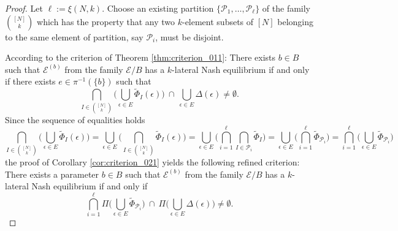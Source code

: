 \documentclass[a4paper,11pt,reqno,english]{amsart}
\theoremstyle{plain}
\theoremstyle{definition}
\newcommand{\Ecal}{\mathcal{E}}
\begin{document}
\begin{proof}
	Let $\ell:=\xi(N,k)$.
	Choose an existing partition $\{\mathcal{P}_1,\dots,\mathcal{P}_{\ell}\}$ of the family $\binom{[N]}{k}$ which has the property that any two $k$-element subsets of $[N]$ belonging to the same element of partition, say $\mathcal{P}_i$, must be disjoint.

	\smallskip
	According to the criterion of Theorem \ref{thm:criterion_011}: There exists  $b\in B$ such that  $\Ecal^{(b)}$ from the family $\Ecal/B$ has a $k$-lateral Nash equilibrium if and only if there exists  $e\in \pi^{-1}(\{b\})$ such that
	\[
		\bigcap_{I\in\binom{[N]}{k}}\big(\bigcup_{\epsilon\in E}\widetilde{\Phi}_I (\epsilon)\big) \ \cap \ \bigcup_{\epsilon\in E} \Delta(\epsilon)\neq \emptyset.
	\]
	Since the sequence of equalities holds
	\[
		\bigcap_{I\in\binom{[N]}{k}}\big(\bigcup_{\epsilon\in E}\widetilde{\Phi}_I (\epsilon)\big)=
		\bigcup_{\epsilon\in E}\big( \bigcap_{I\in\binom{[N]}{k}}\widetilde{\Phi}_I (\epsilon)\big)=
		\bigcup_{\epsilon\in E}\big( \bigcap_{i=1}^{\ell}\bigcap_{I\in\mathcal{P}_i}\widetilde{\Phi}_{I} \big)=
		\bigcup_{\epsilon\in E}\big( \bigcap_{i=1}^{\ell} \widetilde{\Phi}_{\mathcal{P}_i}\big)=
		\bigcap_{i=1}^{\ell}\big(\bigcup_{\epsilon\in E} \widetilde{\Phi}_{\mathcal{P}_i}\big)
	\]
	the proof of Corollary \ref{cor:criterion_021} yields the following refined criterion: There exists a parameter $b\in B$ such that  $\Ecal^{(b)}$ from the family $\Ecal/B$ has a $k$-lateral Nash equilibrium if and only if
	\begin{displaymath}
		\bigcap_{i=1}^{\ell} \Pi\big(\bigcup_{\epsilon\in E} \widetilde{\Phi}_{\mathcal{P}_i}\big)\ \cap \ \Pi\big(\bigcup_{\epsilon\in E} \Delta(\epsilon)\big)\neq \emptyset.
	\end{displaymath}


\end{proof}
\end{document}
